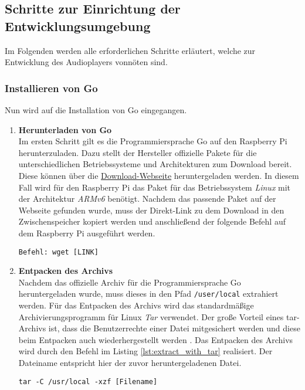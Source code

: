 \subsection{Schritte zur Einrichtung der Entwicklungsumgebung}
Im Folgenden werden alle erforderlichen Schritte erläutert, welche zur
Entwicklung des Audioplayers vonnöten sind.

\subsubsection{Installieren von Go}
Nun wird auf die Installation von Go eingegangen.

\begin{enumerate}
\item \textbf{Herunterladen von Go} \\
Im ersten Schritt gilt es die Programmiersprache Go auf den Raspberry Pi
herunterzuladen. Dazu stellt der Hersteller offizielle Pakete für die
unterschiedlichen Betriebssysteme und Architekturen zum Download bereit. Diese
können über die \href{https://golang.org/dl/}{Download-Webseite}
heruntergeladen werden. In diesem Fall wird für den Raspberry Pi das Paket für
das Betriebssystem \textit{Linux} mit der Architektur \textit{ARMv6} benötigt.
Nachdem das passende Paket auf der Webseite gefunden wurde, muss der
Direkt-Link zu dem Download in den Zwischenspeicher kopiert werden und
anschließend der folgende Befehl auf dem Raspberry Pi ausgeführt werden.
\begin{lstlisting}[caption={Herunterladen einer Datei}]
Befehl: wget [LINK]
\end{lstlisting}

\item \textbf{Entpacken des Archivs} \\
Nachdem das offizielle Archiv für die Programmiersprache Go heruntergeladen
wurde, muss dieses in den Pfad \verb|/user/local| extrahiert werden. Für
das Entpacken des Archivs wird das standardmäßige Archivierungsprogramm für
Linux \textit{\ac{Tar}} verwendet. Der große Vorteil eines \ac{tar}-Archivs ist,
dass die Benutzerrechte einer Datei mitgesichert werden und diese beim
Entpacken auch wiederhergestellt werden \autocite{tar-wiki_2019}. Das Entpacken
des Archivs wird durch den Befehl im Listing \ref{lst:extract_with_tar}
realisiert. Der Dateiname entspricht hier der zuvor heruntergeladenen Datei.
\begin{lstlisting}[caption={Entpacken eines Archivs},label={lst:extract_with_tar}]
tar -C /usr/local -xzf [Filename]
\end{lstlisting}


\end{enumerate}
